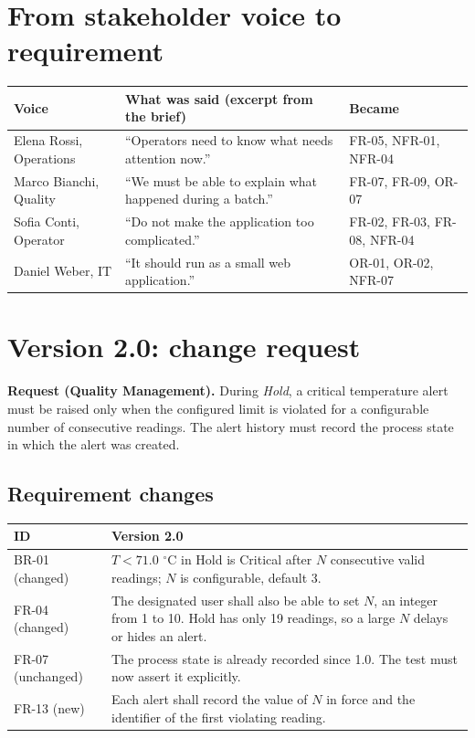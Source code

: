 \documentclass[10pt,a4paper]{article}
\newcommand{\head}[1]{\textbf{\color{courseblue}#1}}
\begin{document}
\section{From stakeholder voice to requirement}
\begin{longtable}{@{}L{22mm}L{80mm}L{50mm}@{}}
\toprule \head{Voice} & \head{What was said (excerpt from the brief)} & \head{Became}\\ \midrule \endhead
Elena Rossi, Operations & ``Operators need to know what needs attention now.'' & FR-05, NFR-01, NFR-04\\
Marco Bianchi, Quality & ``We must be able to explain what happened during a batch.'' & FR-07, FR-09, OR-07\\
Sofia Conti, Operator & ``Do not make the application too complicated.'' & FR-02, FR-03, FR-08, NFR-04\\
Daniel Weber, IT & ``It should run as a small web application.'' & OR-01, OR-02, NFR-07\\
\bottomrule
\end{longtable}

\section{Version 2.0: change request}\label{app:change}
\textbf{Request (Quality Management).} During \emph{Hold}, a critical temperature alert must be raised only when the configured limit is violated for a configurable number of consecutive readings. The alert history must record the process state in which the alert was created.

\subsection{Requirement changes}
\begin{longtable}{@{}L{18mm}L{135mm}@{}}
\toprule \head{ID} & \head{Version 2.0}\\ \midrule \endhead
BR-01 (changed) & $T < 71.0$ $^\circ$C in Hold is Critical after $N$ consecutive valid readings; $N$ is configurable, default 3.\\
FR-04 (changed) & The designated user shall also be able to set $N$, an integer from 1 to 10. Hold has only 19 readings, so a large $N$ delays or hides an alert.\\
FR-07 (unchanged) & The process state is already recorded since 1.0. The test must now assert it explicitly.\\
FR-13 (new) & Each alert shall record the value of $N$ in force and the identifier of the first violating reading.\\
\bottomrule
\end{longtable}
\end{document}
